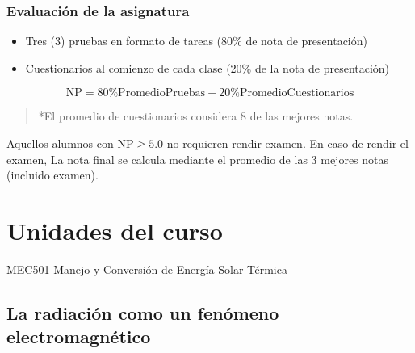 \documentclass[letterpaper,10pt,english]{jupyterBook}
\begin{document}
\section{Evaluación de la asignatura}
\label{\detokenize{0_introduccion/0_introduccion:evaluacion-de-la-asignatura}}\begin{itemize}
\item {} 
\sphinxAtStartPar
Tres (3) pruebas en formato de tareas (80\% de nota de presentación)

\item {} 
\sphinxAtStartPar
Cuestionarios al comienzo de cada clase (20\% de la nota de presentación)

\end{itemize}
\label{equation:0_introduccion/0_introduccion:bf79faf3-d899-49fc-9d89-e683610af0df}\begin{equation}
\mathrm{NP}  = 80\%\mathrm{Promedio Pruebas} + 20\%\mathrm{Promedio Cuestionarios}
\end{equation}\begin{quote}

\sphinxAtStartPar
*El promedio de cuestionarios considera 8 de las mejores notas.
\end{quote}

\sphinxAtStartPar
Aquellos alumnos con \(\mathrm{NP} \geq 5.0\) no requieren rendir examen. En caso de rendir el examen,  La nota final se calcula mediante el promedio de las 3 mejores notas (incluido examen).

\sphinxstepscope


\part{Unidades del curso}

\sphinxstepscope

\sphinxAtStartPar
MEC501 \sphinxhyphen{} Manejo y Conversión de Energía Solar Térmica


\chapter{La radiación como un fenómeno electromagnético}
\label{\detokenize{1_ondas_electromagneticas/1_ondas_electromagneticas:la-radiacion-como-un-fenomeno-electromagnetico}}\label{\detokenize{1_ondas_electromagneticas/1_ondas_electromagneticas::doc}}
\sphinxAtStartPar
\end{document}
